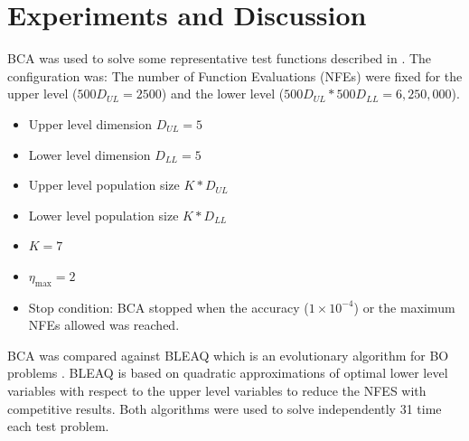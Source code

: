 \documentclass[conference]{IEEEtran}
\begin{document}
\section{Experiments and Discussion}
\label{sec:experiments}

BCA was used to solve some representative test functions described in
\cite{sinha2012unconstrained,sinha2014test}. The configuration was:
% 
% 
The number of Function Evaluations (NFEs) were fixed for the upper level ($500D_{UL} = 2500$)
and the lower level ($500D_{UL}*500D_{LL} = 6,250,000$).

\begin{itemize}
    \item Upper level dimension $D_{UL} = 5$
    \item Lower level dimension $D_{LL} = 5$
    \item Upper level population size $K*D_{UL}$
    \item Lower level population size $K*D_{LL}$
    \item $K = 7$
    \item $\eta_{\max} = 2$
    \item Stop condition: BCA stopped when the accuracy ($1\times 10^{-4}$) or
    the maximum NFEs allowed was reached.
\end{itemize}


BCA was compared against BLEAQ which is an evolutionary algorithm for BO problems
\cite{sinha2013efficient,sinha2018review}. BLEAQ is based on quadratic approximations
of optimal lower level variables with respect to the upper level variables to reduce
the NFES with competitive results. Both algorithms were used to solve independently
31 time each test problem.
\end{document}
